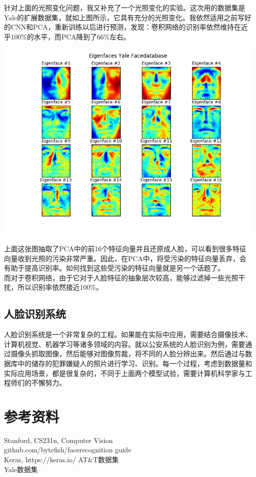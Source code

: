 \documentclass[12pt]{article}
\begin{document}
针对上面的光照变化问题，我又补充了一个光照变化的实验。这次用的数据集是Yale的扩展数据集，就如上图所示，它具有充分的光照变化。我依然适用之前写好的CNN和PCA，重新训练以后进行预测，发现：卷积网络的识别率依然维持在近乎$100\%$的水平，而PCA降到了$66\%$左右。\\

\begin{center}
\includegraphics[width=0.8\linewidth]{../image/eigenfacesYale.png}\\
\end{center}

上面这张图抽取了PCA中的前16个特征向量并且还原成人脸，可以看到很多特征向量收到光照的污染非常严重。因此，在PCA中，将受污染的特征向量丢弃，会有助于提高识别率。如何找到这些受污染的特征向量就是另一个话题了。\\

而对于卷积网络，由于它对于人脸特征的抽象层次较高，能够过滤掉一些光照干扰，所以识别率依然接近$100\%$。

\subsection{人脸识别系统}

人脸识别系统是一个非常复杂的工程。如果能在实际中应用，需要结合摄像技术、计算机视觉、机器学习等诸多领域的内容。就以公安系统的人脸识别为例，需要通过摄像头抓取图像，然后能够对图像剪裁，将不同的人脸分辨出来。然后通过与数据库中的储存的犯罪嫌疑人的照片进行学习、识别。每一个过程，考虑到数据量和实际应用场景，都是很复杂的，不同于上面两个模型试验，需要计算机科学家与工程师们的不懈努力。

\section{参考资料}

Stanford, CS231n, Computer Vision\\
github.com/bytefish/facerecognition guide\\
Keras, https://keras.io/
AT\&T数据集\\
Yale数据集\\
\end{document}
